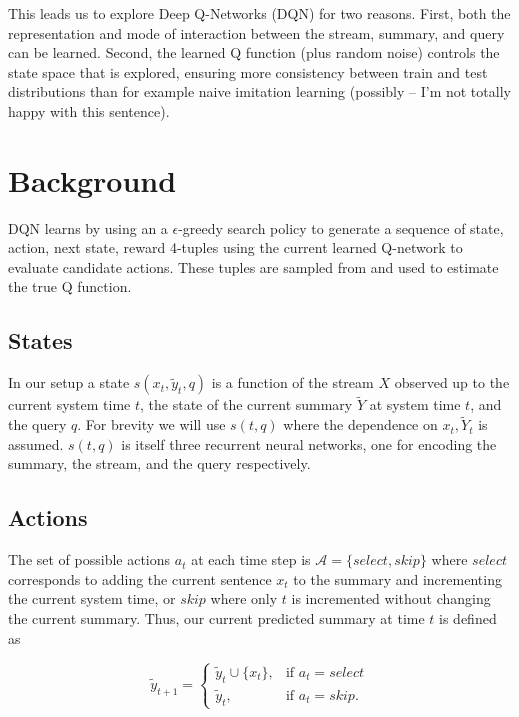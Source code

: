 \documentclass[12pt]{article}
\begin{document}
This leads us to explore Deep Q-Networks (DQN) for two reasons. First, both the representation and mode of interaction between the stream, summary, and 
query can be learned. Second, the learned Q function (plus random noise) controls the state space that is explored, ensuring more consistency between train and test 
distributions than for example naive imitation learning (possibly -- I'm not totally happy with this sentence).

\section{Background}
  
DQN learns by using an a $\epsilon$-greedy search policy to generate a  sequence of state, action, next state, reward 4-tuples using the current learned Q-network to evaluate candidate actions. These tuples are sampled from and used to estimate the true Q function. 

\subsection{States}  

In our setup a state $s(x_{t},\tilde{y}_{t}, q)$ is a function of the stream $X$ observed up to the current system time $t$, the state of the current summary $\tilde{Y}$ at system time $t$, and the query $q$. For brevity we will use $s(t,q)$ where the dependence on $x_{t},\tilde{Y}_{t}$ is assumed. $s(t,q)$ is itself three recurrent neural networks, one for encoding  the summary, the stream, and the query respectively. 

\subsection{Actions} 
The set of possible actions $a_t$ at each time step is $\mathcal{A} = \{select, skip\}$ where $select$ corresponds to adding the current sentence $x_t$ to the summary and incrementing the current system time, or $skip$ where only $t$ is incremented without changing the current summary. Thus, our current predicted summary at time $t$ is defined as

\begin{equation}
	\tilde{y}_{t + 1} =
\begin{cases}
	\tilde{y}_{t} \cup \{ x_t \},	& \text{if } a_t = select  \\
	\tilde{y}_{t}, 			& \text{if } a_t = skip.
\end{cases}
\end{equation}
\end{document}
